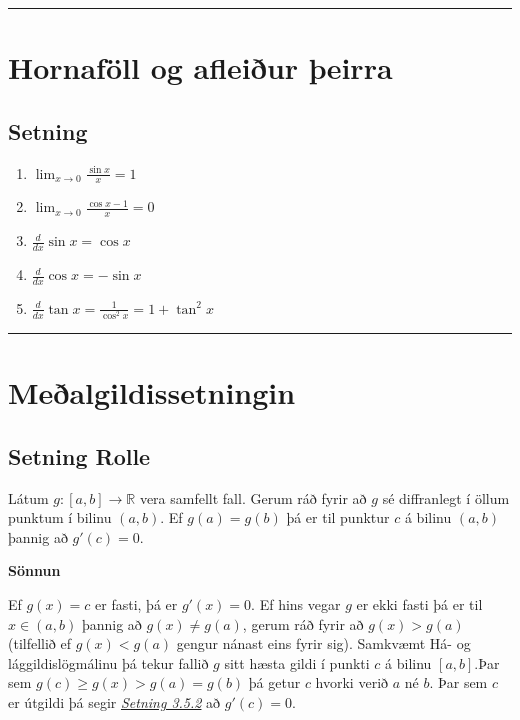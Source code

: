 \documentclass[b5paper,10pt,icelandic]{sphinxmanual}
\begin{document}
\bigskip\hrule{}\bigskip



\section{Hornaföll og afleiður þeirra}
\label{kafli03:hornafoll-og-afleiur-eirra}

\subsection{Setning}
\label{kafli03:id12}\begin{enumerate}
\item {} 
\(\displaystyle\lim_{x\rightarrow 0}\frac{\sin x}{x}=1\)

\item {} 
\(\displaystyle\lim_{x\rightarrow 0}\frac{\cos x-1}{x}=0\)

\item {} 
\(\displaystyle\frac{d}{dx}\sin x=\cos x\)

\item {} 
\(\displaystyle\frac{d}{dx}\cos x=-\sin x\)

\item {} 
\(\displaystyle\frac{d}{dx}\tan x=\frac{1}{\cos^2 x}=1+\tan^2 x\)

\end{enumerate}


\bigskip\hrule{}\bigskip



\section{Meðalgildissetningin}
\label{kafli03:mealgildissetningin}

\subsection{Setning Rolle}
\label{kafli03:setning-rolle}\label{kafli03:index-6}\label{kafli03:rolle}
Látum \(g:[a,b]\rightarrow{{\mathbb  R}}\) vera samfellt fall. Gerum
ráð fyrir að \(g\) sé diffranlegt í öllum punktum í bilinu
\((a,b)\). Ef \(g(a)=g(b)\) þá er til punktur \(c\) á bilinu
\((a,b)\) þannig að \(g'(c)=0\).

\textbf{Sönnun}

Ef \(g(x)=c\) er fasti, þá er \(g'(x)=0\). Ef hins vegar
\(g\) er ekki fasti þá er til \(x \in (a,b)\) þannig að
\(g(x)\neq g(a)\), gerum ráð fyrir að \(g(x)>g(a)\)
(tilfellið ef \(g(x)<g(a)\) gengur nánast eins fyrir sig).
Samkvæmt Há- og lággildislögmálinu
þá tekur fallið \(g\) sitt hæsta
gildi í punkti \(c\) á bilinu \([a,b]\).Þar sem
\(g(c)\geq g(x) >  g(a) = g(b)\) þá getur \(c\) hvorki verið
\(a\) né \(b\).
Þar sem \(c\)
er útgildi þá segir {\hyperref[kafli03:setning\string-3\string-5\string-2]{\emph{Setning 3.5.2}}} að \(g'(c)=0\).
\end{document}

